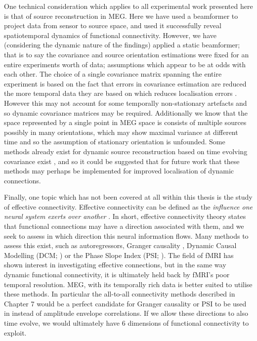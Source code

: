 One technical consideration which applies to all experimental work presented here is that of source reconstruction in MEG. Here we have used a beamformer \citep{Robinson1999,Brookes2008} to project data from sensor to source space, and used it successfully reveal spatiotemporal dynamics of functional connectivity. However, we have (considering the dynamic nature of the findings) applied a static beamformer; that is to say the covariance and source orientation estimations were fixed for an entire experiments worth of data; assumptions which appear to be at odds with each other. The choice of a single covariance matrix spanning the entire experiment is based on the fact that errors in covariance estimation are reduced the more temporal data they are based on which reduces localisation errors \citep{Brookes2008}. However this may not account for some temporally non-stationary artefacts and so dynamic covariance matrices may be required. Additionally we know that the space represented by a single point in MEG space is consists of multiple sources possibly in many orientations, which may show maximal variance at different time and so the assumption of stationary orientation is unfounded. Some methods already exist for dynamic source reconstruction based on time evolving covariance exist \citep{Dalal2008,Woolrich2013}, and so it could be suggested that for future work that these methods may perhaps be implemented for improved localisation of dynamic connections. 

Finally, one topic which has not been covered at all within this thesis is the study of effective connectivity. Effective connectivity can be defined as the \textit{influence one neural system exerts over another} \citep{Friston1994}. In short, effective connectivity theory states that functional connections may have a direction associated with them, and we seek to assess in which direction this neural information flows. Many methods to assess this exist, such as autoregressors, Granger causality \citep{Granger1969}, Dynamic Causal Modelling (DCM; \citealp{Friston2003}) or the Phase Slope Index (PSI; \citealp{Nolte2008}). The field of fMRI has shown interest in investigating effective connections, but in the same way dynamic functional connectivity, it is ultimately held back by fMRI's poor temporal resolution. MEG, with its temporally rich data is better suited to utilise these methods. In particular the all-to-all connectivity methods described in Chapter 7 would be a perfect candidate for Granger causality or PSI to be used in instead of amplitude envelope correlations. If we allow these directions to also time evolve, we would ultimately have 6 dimensions of functional connectivity to exploit. 

